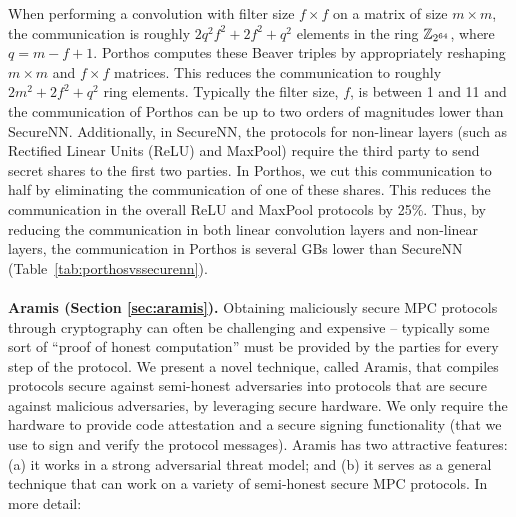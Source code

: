 When performing a convolution with filter size $f\times f$ on a matrix of size $m\times m$, the communication is roughly $2q^2f^2+2f^2+q^2$ elements in the ring $\mathbb{Z}_{2^{64}}$, where $q = m-f+1$. 
Porthos computes these Beaver triples by appropriately reshaping $m\times m$ and $f\times f$ matrices. 
This reduces the communication to roughly $2m^2+2f^2+q^2$ ring elements. 
Typically the filter size, $f$, is between 1 and 11 and the communication of Porthos can be up to two orders of magnitudes lower than SecureNN. 
Additionally, in SecureNN, the protocols for non-linear layers (such as Rectified Linear Units (ReLU) and MaxPool)  require the third party to send secret shares to the first two parties. 
In Porthos, we cut this communication to half by eliminating the communication of one of these shares. 
This reduces the communication in the overall ReLU and MaxPool protocols by 25\%.
Thus, by reducing the communication in both linear convolution layers and non-linear layers, the communication in Porthos is several  GBs lower than SecureNN  (Table~\ref{tab:porthosvssecurenn}). 
\\\\ 
\noindent\textbf{Aramis (Section \ref{sec:aramis}).}
Obtaining maliciously secure MPC protocols through
cryptography can often be challenging and expensive -- typically some
sort of ``proof of honest computation'' must be provided by the
parties for every step of the protocol. We present a novel technique, called Aramis, that compiles \mpc
protocols secure against semi-honest adversaries into \mpc protocols
that are secure against malicious adversaries, by leveraging secure
hardware. 
We only require the hardware to provide
code attestation and a secure signing functionality (that we use to
sign and verify the protocol messages). Aramis has two attractive features: (a) it works in a strong adversarial threat model; and (b) it serves as a general technique that can work on a variety of semi-honest secure MPC protocols. In more detail:


